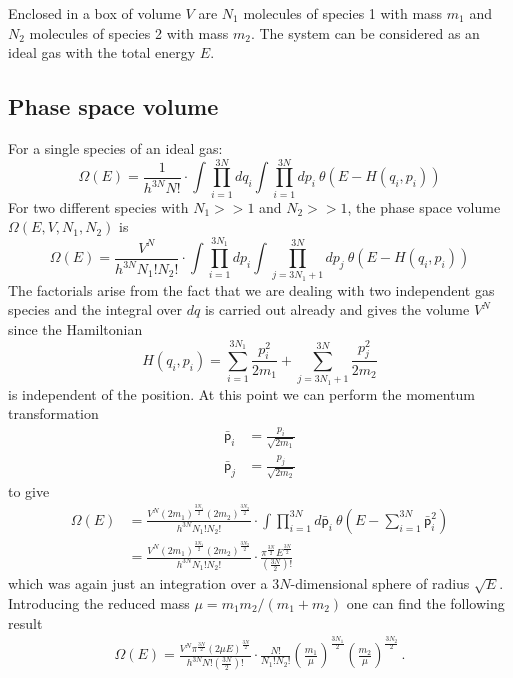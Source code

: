 Enclosed in a box of volume $V$ are $N_1$ molecules of species 1 with mass $m_1$
and $N_2$ molecules of species 2 with mass $m_2$. The system can be 
considered as an ideal gas with the total energy $E$.

\subsection{Phase space volume}
    For a single species of an ideal gas:
    \begin{equation}
        \Omega(E)=\frac{1}{h^{3N}N!}\cdot
        \int \prod_{i=1}^{3N} dq_i \int \prod_{i=1}^{3N} dp_i \ \theta\left(E - H(q_i, p_i)\right)
    \end{equation}
    For two different species with $N_1>>1$ and $N_2>>1$, 
    the phase space volume $\Omega(E,V,N_1,N_2)$ is
    \begin{equation}
        \Omega(E)=\frac{V^N}{h^{3N}N_1!N_2!}\cdot
        \int \prod_{i=1}^{3N_1} dp_i \int \prod_{j=3N_1+1}^{3N} dp_j \ \theta\left(E - H(q_i, p_i)\right)
    \end{equation}
    The factorials arise from the fact that we are dealing with two independent gas species and the integral over $dq$
    is carried out already and gives the volume $V^N$ since the Hamiltonian 
    \begin{equation}
    H(q_i, p_i) = \sum_{i=1}^{3N_1}\frac{p_i^2}{2m_1} + \sum_{j=3N_1+1}^{3N}\frac{p_j^2}{2m_2}
	\end{equation}        
    is independent of the position.
    At this point we can perform the momentum transformation
    \begin{align}
        \bar{\mathsf{p}}_i &= \frac{p_i}{\sqrt{2m_1}} \\
        \bar{\mathsf{p}}_j &= \frac{p_j}{\sqrt{2m_2}}
    \end{align}
    to give 
    \begin{align}
        \Omega(E)&=\frac{V^N (2m_1)^{\frac{3N_1}{2}} (2m_2)^{\frac{3N_2}{2}}}{h^{3N}N_1!N_2!}\cdot
        \int \prod_{i=1}^{3N} d\bar{\mathsf{p}}_i \ \theta\left(E - \sum_{i=1}^{3N}\bar{\mathsf{p}}_i^2\right) \\
        &=\frac{V^N (2m_1)^{\frac{3N_1}{2}} (2m_2)^{\frac{3N_2}{2}}}{h^{3N}N_1!N_2!}\cdot
        \frac{\pi^{\frac{3N}{2}} E^{\frac{3N}{2}}}{(\frac{3N}{2})!}
    \end{align}
    which was again just an integration over a $3N$-dimensional sphere of radius $\sqrt{E}$. \\
    Introducing the reduced mass $\mu = m_1 m_2 / (m_1 + m_2)$ one can find the following result
    \begin{align}
        \Omega(E)=\frac{V^N \pi^{\frac{3N}{2}} (2\mu E)^{\frac{3N}{2}}}{h^{3N}N!\left(\frac{3N}{2}\right)!}\cdot
        \frac{N!}{N_1!N_2!}\left( \frac{m_1}{\mu} \right)^{\frac{3N_1}{2}}\left( \frac{m_2}{\mu} \right)^{\frac{3N_2}{2}} \,.
    \end{align}
    

